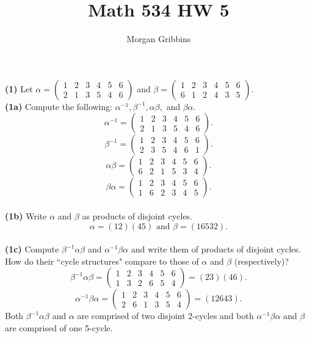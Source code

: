 \documentclass[12pt,letterpaper]{article}
\title{Math 534 HW 5}
\author{Morgan Gribbins}
\date{}
\begin{document}
	
\maketitle

\textbf{(1)} Let \(\alpha = \begin{pmatrix} 1 & 2 & 3 & 4 & 5 & 6 \\ 2 & 1 & 3 & 5 & 4 & 6 \end{pmatrix}\) and \(\beta = \begin{pmatrix} 1 & 2 & 3 & 4 & 5 & 6 \\ 6 & 1 & 2 & 4 & 3 & 5 \end{pmatrix}\).\\



\textbf{(1a)} Compute the following: \(\alpha^{-1}, \beta^{-1}, \alpha\beta,\) and \(\beta\alpha\).\\

\[\alpha^{-1} = \begin{pmatrix} 1 & 2 & 3 & 4 & 5 & 6 \\ 2 & 1 & 3 & 5 & 4 & 6 \end{pmatrix}.\] \[\beta^{-1} = \begin{pmatrix} 1 & 2 & 3 & 4 & 5 & 6 \\ 2 & 3 & 5 & 4 & 6 & 1 \end{pmatrix}.\] \[\alpha\beta = \begin{pmatrix} 1 & 2 & 3 & 4 & 5 & 6 \\ 6 & 2 & 1 & 5 & 3 & 4 \end{pmatrix}.\] \[\beta\alpha = \begin{pmatrix} 1 & 2 & 3 & 4 & 5 & 6 \\ 1 & 6 & 2 & 3 & 4 & 5 \end{pmatrix}.\] \\

\textbf{(1b)} Write \(\alpha\) and \(\beta\) as products of disjoint cycles.\\

\[\alpha = (12)(45) \text{ and } \beta = (16532).\] \\

\textbf{(1c)} Compute \(\beta^{-1}\alpha\beta\) and \(\alpha^{-1}\beta\alpha\) and write them of products of disjoint cycles. How do their ``cycle structures" compare to those of \(\alpha\) and \(\beta\) (respectively)?\\

\[\beta^{-1}\alpha\beta = \begin{pmatrix} 1 & 2 & 3 & 4 & 5 & 6 \\ 1 & 3 & 2 & 6 & 5 & 4 \end{pmatrix} = (23)(46).\] \[\alpha^{-1}\beta\alpha = \begin{pmatrix} 1 & 2 & 3 & 4 & 5 & 6 \\ 2 & 6 & 1 & 3 & 5 & 4 \end{pmatrix} = (12643).\] Both \(\beta^{-1}\alpha\beta\) and \(\alpha\) are comprised of two disjoint 2-cycles and both \(\alpha^{-1}\beta\alpha\) and \(\beta\) are comprised of one 5-cycle. \\
\end{document}
